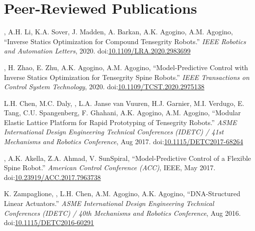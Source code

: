 \documentclass[letterpaper]{deedy-resume} %
\newcommand\doilink[1]{\href{http://dx.doi.org/#1}{#1}}
\newcommand\doi[1]{doi:\doilink{#1}}
\begin{document}
{\vspace{0.2cm}
\section{Peer-Reviewed Publications}
\vspace{0.2cm}


\begin{etaremune}

\item \underline{{}}, A.H. Li, K.A. Sover, J. Madden, A. Barkan, A.K. Agogino, A.M. Agogino, ``Inverse Statics Optimization for Compound Tensegrity Robots.'' {\it IEEE Robotics and Automation Letters}, 2020. \doi{10.1109/LRA.2020.2983699}

\item \underline{{}}, H. Zhao, E. Zhu, A.K. Agogino, A.M. Agogino, ``Model-Predictive Control with Inverse Statics Optimization for Tensegrity Spine Robots.'' {\it IEEE Transactions on Control System Technology}, 2020. \doi{10.1109/TCST.2020.2975138}

\item L.H. Chen, M.C. Daly, \underline{{}}, L.A. Janse van Vuuren, H.J. Garnier, M.I. Verdugo, E. Tang, C.U. Spangenberg, F. Ghahani, A.K. Agogino, A.M. Agogino, ``Modular Elastic Lattice Platform for Rapid Prototyping of Tensegrity Robots.'' {\it  ASME International Design Engineering Technical Conferences (IDETC) / 41st Mechanisms and Robotics Conference}, Aug 2017. \doi{10.1115/DETC2017-68264}

\item \underline{{}}, A.K. Akella, Z.A. Ahmad, V. SunSpiral, ``Model-Predictive Control of a Flexible Spine Robot.'' {\it American Control Conference (ACC)}, IEEE, May 2017. \doi{10.23919/ACC.2017.7963738}

\item K. Zampaglione, \underline{{}}, L.H. Chen, A.M. Agogino,  A.K. Agogino, ``DNA-Structured Linear Actuators.'' {\it ASME International Design Engineering Technical Conferences (IDETC) / 40th Mechanisms and Robotics Conference}, Aug 2016. \doi{10.1115/DETC2016-60291}
  

\end{etaremune}}
\end{document}
